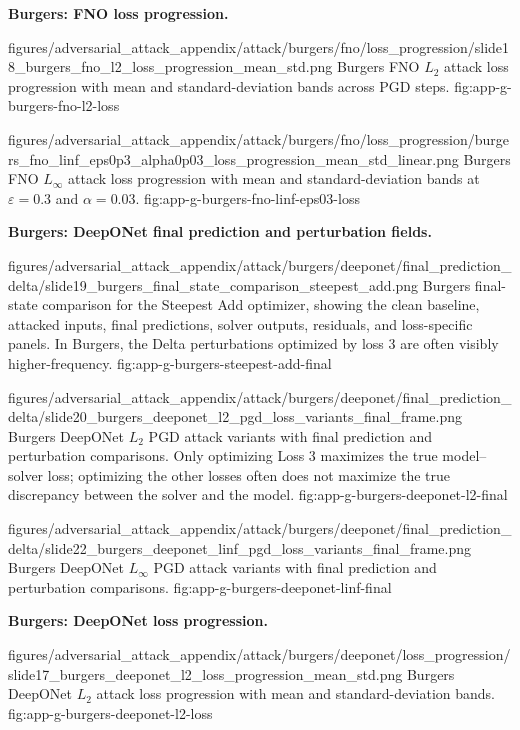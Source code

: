\documentclass[letterpaper]{article} %
\begin{document}
\clearpage

\noindent\textbf{Burgers: FNO loss progression.}

\appendixattackfig
  {figures/adversarial_attack_appendix/attack/burgers/fno/loss_progression/slide18_burgers_fno_l2_loss_progression_mean_std.png}
  {Burgers FNO $L_2$ attack loss progression with mean and standard-deviation
  bands across PGD steps.}
  {fig:app-g-burgers-fno-l2-loss}

\appendixattackfig
  {figures/adversarial_attack_appendix/attack/burgers/fno/loss_progression/burgers_fno_linf_eps0p3_alpha0p03_loss_progression_mean_std_linear.png}
  {Burgers FNO $L_\infty$ attack loss progression with mean and
  standard-deviation bands at $\varepsilon=0.3$ and $\alpha=0.03$.}
  {fig:app-g-burgers-fno-linf-eps03-loss}

\FloatBarrier
\noindent\textbf{Burgers: DeepONet final prediction and perturbation fields.}


\appendixattackfig
  {figures/adversarial_attack_appendix/attack/burgers/deeponet/final_prediction_delta/slide19_burgers_final_state_comparison_steepest_add.png}
  {Burgers final-state comparison for the Steepest Add optimizer, showing the
  clean baseline, attacked inputs, final predictions, solver outputs, residuals,
  and loss-specific panels. In Burgers, the Delta perturbations optimized by
  loss 3 are often visibly higher-frequency.}
  {fig:app-g-burgers-steepest-add-final}

\appendixattackfigcompact
  {figures/adversarial_attack_appendix/attack/burgers/deeponet/final_prediction_delta/slide20_burgers_deeponet_l2_pgd_loss_variants_final_frame.png}
  {Burgers DeepONet $L_2$ PGD attack variants with final prediction and
  perturbation comparisons. Only optimizing Loss 3 maximizes the true
  model--solver loss; optimizing the other losses often does not maximize the
  true discrepancy between the solver and the model.}
  {fig:app-g-burgers-deeponet-l2-final}

\appendixattackfigcompact
  {figures/adversarial_attack_appendix/attack/burgers/deeponet/final_prediction_delta/slide22_burgers_deeponet_linf_pgd_loss_variants_final_frame.png}
  {Burgers DeepONet $L_\infty$ PGD attack variants with final prediction and
  perturbation comparisons.}
  {fig:app-g-burgers-deeponet-linf-final}

\noindent\textbf{Burgers: DeepONet loss progression.}

\appendixattackfig
  {figures/adversarial_attack_appendix/attack/burgers/deeponet/loss_progression/slide17_burgers_deeponet_l2_loss_progression_mean_std.png}
  {Burgers DeepONet $L_2$ attack loss progression with mean and
  standard-deviation bands.}
  {fig:app-g-burgers-deeponet-l2-loss}
\end{document}
